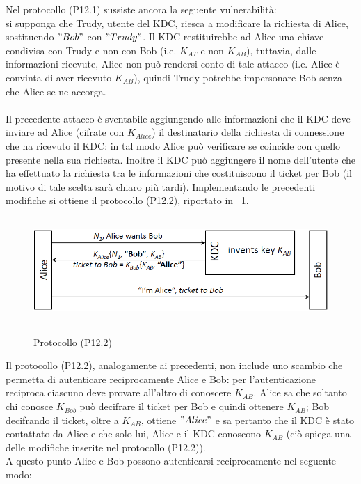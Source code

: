 Nel protocollo (P12.1) sussiste ancora la seguente vulnerabilità:\\
si supponga che Trudy, utente del KDC, riesca a modificare la richiesta di Alice, sostituendo $"Bob"$ con $"Trudy"$. Il KDC restituirebbe ad Alice una chiave condivisa con Trudy e non con Bob (i.e. $K_{AT}$ e non $K_{AB}$), tuttavia, dalle informazioni ricevute, Alice non può rendersi conto di tale attacco (i.e. Alice è convinta di aver ricevuto $K_{AB}$), quindi Trudy potrebbe impersonare Bob senza che Alice se ne accorga.\\ \\
Il precedente attacco è sventabile aggiungendo alle informazioni che il KDC deve inviare ad Alice (cifrate con $K_{Alice}$) il destinatario della richiesta di connessione che ha ricevuto il KDC: in tal modo Alice può verificare se coincide con quello presente nella sua richiesta. Inoltre il KDC può aggiungere il nome dell'utente che ha effettuato la richiesta tra le informazioni che costituiscono il ticket per Bob (il motivo di tale scelta sarà chiaro più tardi).
Implementando le precedenti modifiche si ottiene il protocollo (P12.2), riportato in \figurename~\ref{fig:ImgS106bis}.
\begin{figure}[htbp]
	\centering%
	\subfigure%
	{\includegraphics[height=4cm, width=12cm, keepaspectratio]{Immagini/autenticazione/ImgS106bis.png}}
	\caption{Protocollo (P12.2)}\label{fig:ImgS106bis} 	
\end{figure}
Il protocollo (P12.2), analogamente ai precedenti, non include uno scambio che permetta di autenticare reciprocamente Alice e Bob: per l'autenticazione reciproca ciascuno deve provare all'altro di conoscere $K_{AB}$. Alice sa che soltanto chi conosce $K_{Bob}$ può decifrare il ticket per Bob e quindi ottenere $K_{AB}$; Bob decifrando il ticket, oltre a $K_{AB}$, ottiene $"Alice"$ e sa pertanto che il KDC è stato contattato da Alice e che solo lui,
Alice e il KDC conoscono $K_{AB}$ (ciò spiega una delle modifiche inserite nel protocollo (P12.2)).\\
A questo punto Alice e Bob possono autenticarsi reciprocamente nel seguente modo:
